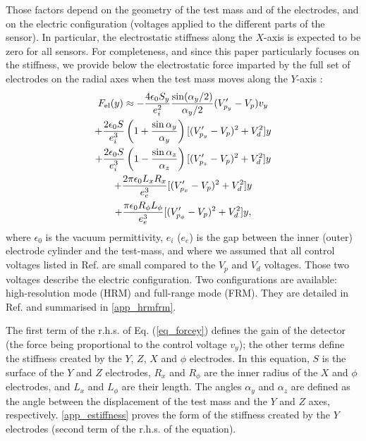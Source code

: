 \documentclass[12pt]{iopart}
\begin{document}
Those factors depend on the geometry of the test mass and of the electrodes, and on the electric configuration (voltages applied to the different parts of the sensor). In particular, the electrostatic stiffness along the $X$-axis is expected to be zero for all sensors.
For completeness, and since this paper particularly focuses on the stiffness, we provide below the electrostatic force imparted by the full set of electrodes on the radial axes when the test mass moves along the $Y$-axis \cite{liorzou20}:
\begin{multline} \label{eq_forcey}
F_{\rm el}(y) \approx -\frac{4\epsilon_0 S_y}{e_i^2} \frac{\sin (\alpha_y/2)}{\alpha_y/2} (V'_{p_y}-V_p)v_y \\
+ \frac{2 \epsilon_0 S}{e_i^3} \left(1 + \frac{\sin \alpha_y}{\alpha_y} \right) [(V'_{p_y}-V_p)^2 +V_d^2]y \\
+ \frac{2 \epsilon_0 S}{e_i^3} \left(1 - \frac{\sin \alpha_z}{\alpha_z} \right) [(V'_{p_z}-V_p)^2 +V_d^2]y \\
+\frac {2\pi \epsilon_0 L_x R_x} {e_e^3} [(V'_{p_x}-V_p)^2 + V_d^2]y \\
+\frac {\pi \epsilon_0 R_{\phi} L_{\phi}} {e_e^3} [(V'_{p_{\phi}}-V_p)^2 + V_d^2]y,
\end{multline}
where $\epsilon_0$ is the vacuum permittivity, $e_i$ ($e_e$) is the gap between the inner (outer) electrode cylinder and the test-mass, and where we assumed that all control voltages  listed in Ref. \cite{liorzou20} are small compared to the $V_p$ and $V_d$ voltages. Those two voltages describe the electric configuration. Two configurations are available: high-resolution mode (HRM) and full-range mode (FRM). They are detailed in Ref. \cite{liorzou20} and summarised in \ref{app_hrmfrm}. 

The first term of the r.h.s. of Eq. (\ref{eq_forcey}) defines the gain of the detector (the force being proportional to the control voltage $v_y$); the other terms define the stiffness created by the $Y$, $Z$, $X$ and $\phi$ electrodes. In this equation, $S$ is the surface of the $Y$ and $Z$ electrodes, $R_x$ and $R_\phi$ are the inner radius of the $X$ and $\phi$ electrodes, and $L_x$ and $L_\phi$ are their length. The angles $\alpha_y$ and $\alpha_z$ are defined as the angle between the displacement of the test mass and the $Y$ and $Z$ axes, respectively. 
\ref{app_estiffness} proves the form of the stiffness created by the $Y$ electrodes (second term of the r.h.s. of the equation).
\end{document}
